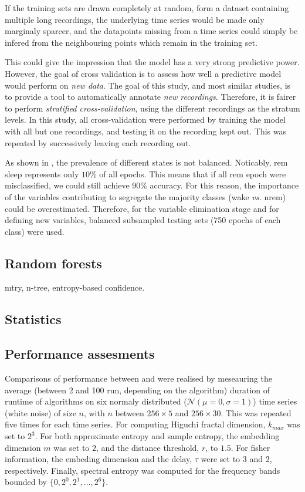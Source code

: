 If the training sets are drawn completely at random, form a dataset containing multiple long recordings, 
the underlying time series would be made only marginaly sparcer, and the datapoints missing from
a time series could simply be infered from the neighbouring points which remain in the training set.

This could give the impression that the model has a very strong predictive power.
However, the goal of cross validation is to assess how well a predictive model would perform on \emph{new data}. 
The goal of this study, and most similar studies, is to provide a tool to automatically annotate \emph{new recordings}. 
Therefore, it is fairer to perform \emph{stratified cross-validation}, using the different recordings as the stratum levels.
In this study, all cross-validation were performed by training the model with all but one recordings,
and testing it on the recording kept out. This was repeated by successively leaving each recording out.

As shown in , the prevalence of different states is not balanced. Noticably, \gls{rem} sleep represents only $10\%$ of all epochs.
This means that if all \gls{rem} epoch were misclassified, we could still achieve $90\%$ accuracy.
For this reason, the importance of the variables contributing to segregate the majority classes (wake \emph{vs.} \gls{nrem}) could be overestimated.
Therefore, for the variable elimination stage and for defining new variables,
balanced subsampled testing sets (750 epochs of each class) were used.




\subsection{Random forests}
mtry, n-tree, entropy-based confidence.
\subsection{Statistics}

\subsection{Performance assesments}
Comparisons of performance between \pr{} and \pyeeg{} were realised by meseauring the average (between 2 and 100 run, depending on the algorithm) duration of runtime of algorithms on six
normaly distributed ($\mathcal{N}(\mu=0,\sigma=1)$) time series (\ie white noise) of size $n$,
with $n$ between $256 \times{} 5$ and $256 \times{} 30$.
This was repeated five times for each time series.
For computing  Higuchi fractal dimension, $k_{max}$ was set to $2^3$.
For both approximate entropy and sample entropy, the embedding dimension $m$ was set to $2$, and the distance threshold, $r$, to $1.5$.
For fisher information, the embeding dimension and the delay, $\tau$ were set to $3$ and $2$, respectively.
Finally, spectral entropy was computed for the frequency bands bounded by $\{0, 2^0, 2^1, ..., 2^6\}$.



